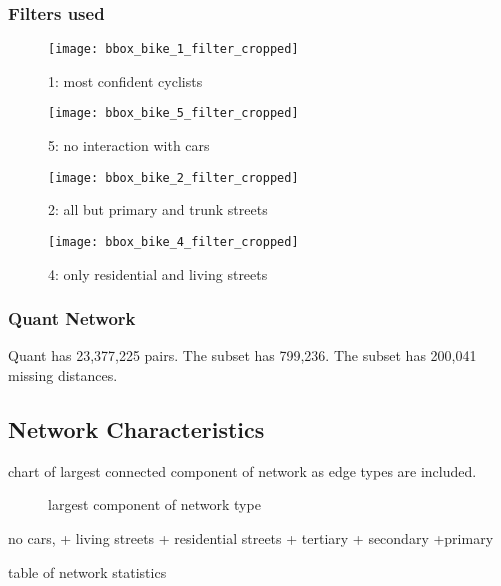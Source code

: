 \subsubsection{Filters used}

\begin{figure}
  \centering
  \texttt{[image: bbox\_bike\_1\_filter\_cropped]}
  \caption{1: most confident cyclists}
  \label{fig:sub1}
\end{figure}

\begin{figure}
  \centering
  \texttt{[image: bbox\_bike\_5\_filter\_cropped]}
  \caption{5: no interaction with cars }
  \label{fig:sub2}
\end{figure}



\begin{figure}
  \centering
  \texttt{[image: bbox\_bike\_2\_filter\_cropped]}
  \caption{2: all but primary and trunk streets}
  \label{fig:sub2}
\end{figure}



\begin{figure}
  \centering
  \texttt{[image: bbox\_bike\_4\_filter\_cropped]}
  \caption{4: only residential and living streets}
  \label{fig:sub2}
\end{figure}


\subsubsection{Quant Network}

Quant has 23,377,225 pairs. The subset has 799,236. The subset has 200,041 missing distances. 


\subsection{Network Characteristics}

chart of largest connected component of network as edge types are included. 

\begin{figure}
\centering
\caption{largest component of network type}
\label{fig:connected_component}
\end{figure}

no cars,
+ living streets
+ residential streets
+ tertiary 
+ secondary
+primary

\begin{table}
\centering
\caption{table of network statistics}
\label{table:network_stats}
\end{table}

